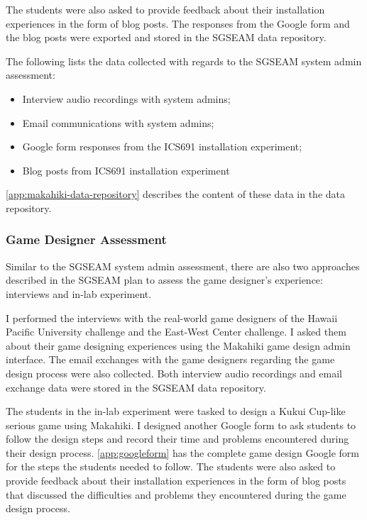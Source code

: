 The students were also asked to provide feedback about their installation experiences in the form of blog posts. The responses from the Google form and the blog posts were exported and stored in the SGSEAM data repository.

The following lists the data collected with regards to the SGSEAM system admin assessment:

\begin{itemize}
\item Interview audio recordings with system admins;
\item Email communications with system admins;
\item Google form responses from the ICS691 installation experiment; 
\item Blog posts from ICS691 installation experiment
\end{itemize}

\autoref{app:makahiki-data-repository} describes the content of these data in the data repository.

\subsubsection{Game Designer Assessment}

Similar to the SGSEAM system admin assessment, there are also two approaches described in the SGSEAM plan to assess the game designer's experience: interviews and in-lab experiment.

I performed the interviews with the real-world game designers of the Hawaii Pacific University challenge and the East-West Center challenge. I asked them about their game designing experiences using the Makahiki game design admin interface. The email exchanges with the game designers regarding the game design process were also collected. Both interview audio recordings and email exchange data were stored in the SGSEAM data repository.
 
The students in the in-lab experiment were tasked to design a Kukui Cup-like serious game using Makahiki. I designed another Google form to ask students to follow the design steps and record their time and problems encountered during their design process. \autoref{app:googleform} has the complete game design Google form for the steps the students needed to follow. The students were also asked to provide feedback about their installation experiences in the form of blog posts that discussed the difficulties and problems they encountered during the game design process.

